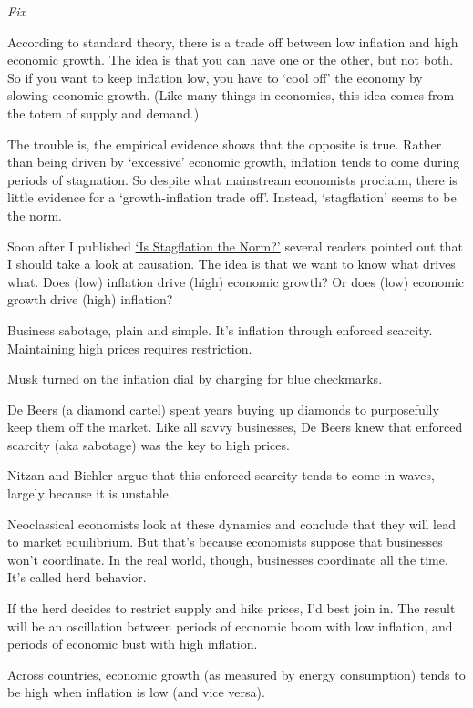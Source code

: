 \documentclass[
]{book}
\begin{document}
\emph{Fix}

According to standard theory, there is a trade off between low inflation and high economic growth. The idea is that you can have one or the other, but not both. So if you want to keep inflation low, you have to `cool off' the economy by slowing economic growth. (Like many things in economics, this idea comes from the totem of supply and demand.)

The trouble is, the empirical evidence shows that the opposite is true. Rather than being driven by `excessive' economic growth, inflation tends to come during periods of stagnation. So despite what mainstream economists proclaim, there is little evidence for a `growth-inflation trade off'. Instead, `stagflation' seems to be the norm.

Soon after I published \href{https://economicsfromthetopdown.com/2023/01/17/is-stagflation-the-norm/}{`Is Stagflation the Norm?'} several readers pointed out that I should take a look at causation. The idea is that we want to know what drives what. Does (low) inflation drive (high) economic growth? Or does (low) economic growth drive (high) inflation?

Business sabotage, plain and simple. It's inflation through enforced scarcity.
Maintaining high prices requires restriction.

Musk turned on the inflation dial by charging for blue checkmarks.

De Beers (a diamond cartel) spent years buying up diamonds to purposefully keep them off the market.
Like all savvy businesses, De Beers knew that enforced scarcity (aka sabotage) was the key to high prices.

Nitzan and Bichler argue that this enforced scarcity tends to come in waves, largely because it is unstable.

Neoclassical economists look at these dynamics and conclude that they will lead to market equilibrium. But that's because economists suppose that businesses won't coordinate. In the real world, though, businesses coordinate all the time.
It's called herd behavior.

If the herd decides to restrict supply and hike prices, I'd best join in. The result will be an oscillation between periods of economic boom with low inflation, and periods of economic bust with high inflation.

Across countries, economic growth (as measured by energy consumption) tends to be high when inflation is low (and vice versa).
\end{document}
